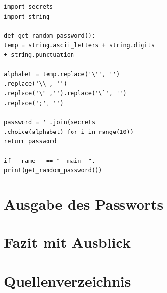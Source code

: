 \documentclass[a4paper,11pt,singlespacing]{article}
\begin{document}
    	\lstset{
    			basicstyle=\ttfamily,
    			language=Python,
    		}
    	

            \begin{lstlisting}
import secrets
import string

def get_random_password():
temp = string.ascii_letters + string.digits 
+ string.punctuation

alphabet = temp.replace('\'', '')
.replace('\\', '')
.replace('\"','').replace('\`', '')
.replace(';', '')

password = ''.join(secrets
.choice(alphabet) for i in range(10))
return password

if __name__ == "__main__":
print(get_random_password())
            \end{lstlisting}
    	
    	\section{Ausgabe des Passworts}
    	
    	
    	
    	\section{Fazit mit Ausblick}
    	
    	\section{Quellenverzeichnis}
        
        
    	
\end{document}

